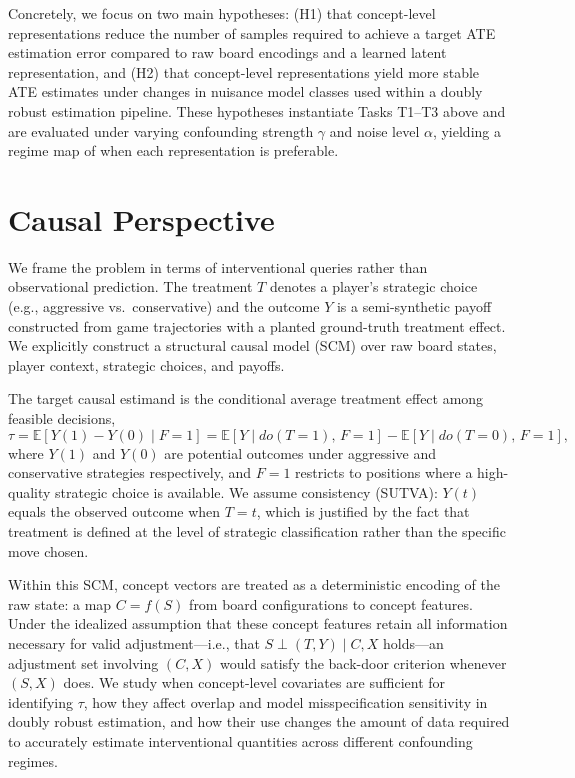 \documentclass{article}
\begin{document}
Concretely, we focus on two main hypotheses: (H1) that concept-level
representations reduce the number of samples required to achieve a target ATE
estimation error compared to raw board encodings and a learned latent
representation, and (H2) that concept-level representations yield more stable ATE
estimates under changes in nuisance model classes used within a doubly robust
estimation pipeline. These hypotheses instantiate Tasks T1--T3 above and are
evaluated under varying confounding strength $\gamma$ and noise level $\alpha$,
yielding a regime map of when each representation is preferable.

\section{Causal Perspective}

We frame the problem in terms of interventional queries rather than observational
prediction.\cite{pearl2009causality} The treatment $T$ denotes a player's strategic
choice (e.g., aggressive vs.\ conservative) and the outcome $Y$ is a semi-synthetic
payoff constructed from game trajectories with a planted ground-truth treatment
effect.\cite{hill2011bayesian} We explicitly construct a structural causal model
(SCM) over raw board states, player context, strategic choices, and payoffs.

The target causal estimand is the conditional average treatment effect among
feasible decisions,
\[
\tau = \mathbb{E}[Y(1) - Y(0) \mid F = 1]
    = \mathbb{E}[Y \mid do(T=1),\, F=1] - \mathbb{E}[Y \mid do(T=0),\, F=1],
\]
where $Y(1)$ and $Y(0)$ are potential outcomes under aggressive and conservative
strategies respectively, and $F=1$ restricts to positions where a high-quality
strategic choice is available. We assume consistency (SUTVA): $Y(t)$ equals the
observed outcome when $T=t$, which is justified by the fact that treatment is
defined at the level of strategic classification rather than the specific move
chosen.\cite{pearl2009causality,hill2011bayesian}

Within this SCM, concept vectors are treated as a deterministic encoding of the
raw state: a map $C = f(S)$ from board configurations to concept features. Under
the idealized assumption that these concept features retain all information necessary
for valid adjustment---i.e., that $S \perp (T,Y) \mid C, X$ holds---an adjustment
set involving $(C, X)$ would satisfy the back-door criterion whenever $(S, X)$
does.\cite{pearl2009causality,scholkopf2021towards} We study when concept-level
covariates are sufficient for identifying $\tau$, how they affect overlap and model
misspecification sensitivity in doubly robust estimation, and how their use changes
the amount of data required to accurately estimate interventional quantities across
different confounding regimes.\cite{chernozhukov2018double,kuang2020information,deconfoundingScores}
\end{document}
